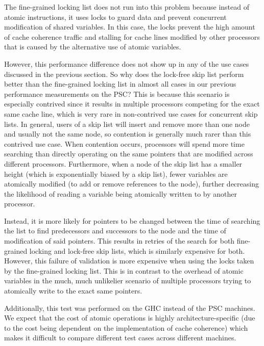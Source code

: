 \documentclass[11pt]{article}
\begin{document}
The fine-grained locking list does not run into this problem because instead of atomic instructions, it uses locks to guard data and prevent concurrent modification of shared variables. In this case, the locks prevent the high amount of cache coherence traffic and stalling for cache lines modified by other processors that is caused by the alternative use of atomic variables.

However, this performance difference does not show up in any of the use cases discussed in the previous section. So why does the lock-free skip list perform better than the fine-grained locking list in almost all cases in our previous performance measurements on the PSC? This is because this scenario is especially contrived since it results in multiple processors competing for the exact same cache line, which is very rare in non-contrived use cases for concurrent skip lists. In general, users of a skip list will insert and remove more than one node and usually not the same node, so contention is generally much rarer than this contrived use case. When contention occurs, processors will spend more time searching than directly operating on the same pointers that are modified across different processors. Furthermore, when a node of the skip list has a smaller height (which is exponentially biased by a skip list), fewer variables are atomically modified (to add or remove references to the node), further decreasing the likelihood of reading a variable being atomically written to by another processor.

Instead, it is more likely for pointers to be changed between the time of searching the list to find predecessors and successors to the node and the time of modification of said pointers. This results in retries of the search for both fine-grained locking and lock-free skip lists, which is similarly expensive for both. However, this failure of validation is more expensive when using the locks taken by the fine-grained locking list. This is in contrast to the overhead of atomic variables in the much, much unlikelier scenario of multiple processors trying to atomically write to the exact same pointers. 

Additionally, this test was performed on the GHC instead of the PSC machines. We expect that the cost of atomic operations is highly architecture-specific (due to the cost being dependent on the implementation of cache coherence) which makes it difficult to compare different test cases across different machines. 
\pagebreak
\end{document}
